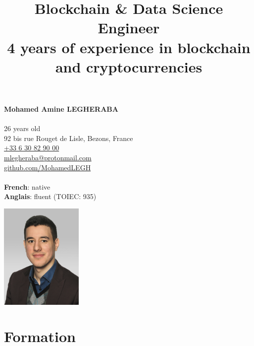 \documentclass[10pt]{article}
\title{\bfseries{\huge{Blockchain \& Data Science Engineer}}\\[0.75cm] \Large{4 years of experience in blockchain and cryptocurrencies} }
\author{\bfseries\Huge \vspace{-4ex}}
\date{}
\begin{document}
\begin{minipage}[t]{0.80\textwidth}
\textbf{\Large{Mohamed Amine LEGHERABA}}\\
\vspace{1ex}\\
26 years old\\
92 bis rue Rouget de Lisle, Bezons, France\\
\href{tel:+33630829000}{+33 6 30 82 90 00}\\
\href{mailto:mlegheraba@protonmail.com}{mlegheraba@protonmail.com}\\
\href{https://github.com/MohamedLEGH}{github.com/MohamedLEGH}\\
\vspace{1ex}\\
{\bf French}: native\\
{\bf Anglais}: fluent (TOIEC: 935)\\
\end{minipage}
\begin{minipage}[t]{0.20\textwidth}
\vspace{-3ex}
\includegraphics[width=4cm]{figures/Legheraba-Mohamed.jpg}
\end{minipage}
{\let\newpage\relax\maketitle}
\thispagestyle{empty}

\vspace{-10ex}

\section*{Formation}

\vspace{2ex}
\end{document}
